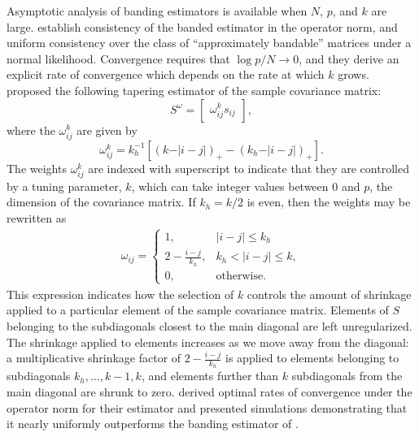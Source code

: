 \bigskip

Asymptotic analysis of banding estimators is available when $N$, $p$, and $k$ are large. \cite{bickel2008regularized} establish consistency of the banded estimator in the operator norm, and uniform consistency over the class of ``approximately bandable'' matrices under a normal likelihood. Convergence requires that $\log p/ N \rightarrow 0$, and they derive an explicit rate of convergence which depends on the rate at which $k$ grows. \cite{cai2010optimal} proposed the following tapering estimator of the sample covariance matrix:
\begin{equation} \label{eq:cai-tapering-estimator}
S^{\omega} =  \begin{bmatrix} \omega_{ij}^k s_{ij} \end{bmatrix},
\end{equation}
\noindent
where the $\omega_{ij}^k$ are given by 
\begin{equation*}
\omega^k_{ij} = k_h^{-1} \left[ \left( k - \vert i-j\vert\right)_+ - \left(k_h - \vert i-j\vert\right)_+ \right].
\end{equation*}
\noindent
The weights $\omega^k_{ij}$ are indexed with superscript to indicate that they  are controlled by a tuning parameter, $k$,  which can take integer values between 0 and $p$, the dimension of the covariance matrix.  If $k_h = k/2$ is even, then the weights may be rewritten as
\begin{align*}
\omega_{ij} = \left\{\begin{array}{ll} 1, & \vert i -j  \vert \le k_h \\
                             2 - \frac{i - j}{k_h}, & k_h < \vert i -j  \vert \le k, \\
                             0, & \mbox{otherwise}.  \end{array} \right.
\end{align*}
\noindent
This expression indicates how the selection of $k$ controls the amount of shrinkage applied to a particular element of the sample covariance matrix. Elements of $S$ belonging to the subdiagonals closest to the main diagonal are left unregularized. The shrinkage applied to elements increases as we move away from the diagonal: a multiplicative shrinkage factor of $2 - \frac{i - j}{k_h}$ is applied to elements belonging to subdiagonals $k_h,\dots,k-1,k$, and elements further than $k$ subdiagonals from the main diagonal are shrunk to zero. \cite{cai2010optimal} derived optimal rates of convergence under the operator norm for their estimator and presented simulations demonstrating that it nearly uniformly outperforms the banding estimator of \cite{bickel2008regularized}.  


